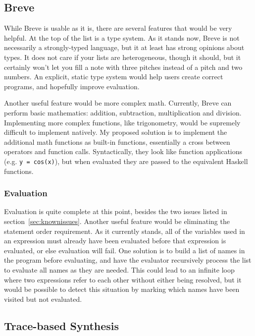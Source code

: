 \documentclass[nocopyrightspace,numbers,10pt]{sigplanconf}
\begin{document}
\subsection{Breve}
\label{sub:future:breve}

While Breve is usable as it is, there are several features that would be very
helpful. At the top of the list is a type system. As it stands now, Breve is not
necessarily a strongly-typed language, but it at least has strong opinions about
types. It does not care if your lists are heterogeneous, though it should, but
it certainly won't let you fill a note with three pitches instead of a pitch and
two numbers. An explicit, static type system would help users create correct
programs, and hopefully improve evaluation.

Another useful feature would be more complex math. Currently, Breve can perform
basic mathematics: addition, subtraction, multiplication and division.
Implementing more complex functions, like trigonometry, would be supremely
difficult to implement natively. My proposed solution is to implement the
additional math functions as built-in functions, essentially a cross between
operators and function calls. Syntactically, they look like function
applications (e.g. \texttt{y = cos(x)}), but when evaluated they are passed to
the equivalent Haskell functions.

\subsubsection{Evaluation}
\label{ssub:future:eval}

Evaluation is quite complete at this point, besides the two issues listed in
section~\ref{sec:knownissues}. Another useful feature would be eliminating the
statement order requirement. As it currently stands, all of the variables used
in an expression must already have been evaluated before that expression is
evaluated, or else evaluation will fail. One solution is to build a list of
names in the program before evaluating, and have the evaluator recursively
process the list to evaluate all names as they are needed. This could lead to
an infinite loop where two expressions refer to each other without either being
resolved, but it would be possible to detect this situation by marking which
names have been visited but not evaluated.

\subsection{Trace-based Synthesis}
\label{sub:future:tsb}
\end{document}
